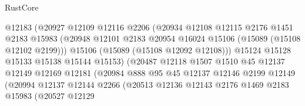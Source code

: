 \begin{lexlean}{RustCore}
\begin{coremodule}
                                  @12183
                                  (@20927
                                    @12109
                                    @12116
                                    @2206
                                    (@20934
                                      @12108
                                      @12115
                                      @2176
                                      @1451
                                      @2183
                                      @15983
                                      (@20948
                                        @12101
                                        @2183
                                        @20954
                                        @16024
                                        @15106
                                        (@15089 (@15108 @12102 @2199)))
                                      @15106
                                      (@15089 (@15108 @12092 @12108)))
                                    @15124
                                    @15128
                                    @15133
                                    @15138
                                    @15144
                                    @15153)
                                  (@20487
                                    @12118
                                    @1507
                                    @1510
                                    @45
                                    @12137
                                    @12149
                                    @12169
                                    @12181
                                    (@20984
                                      @888
                                      @95
                                      @45
                                      @12137
                                      @12146
                                      @2199
                                      @12149
                                      (@20994
                                        @12137
                                        @12144
                                        @2266
                                        (@20513
                                          @12136
                                          @12143
                                          @2176
                                          @1469
                                          @2183
                                          @15983
                                          (@20527
                                            @12129

\end{coremodule}
\end{lexlean}
